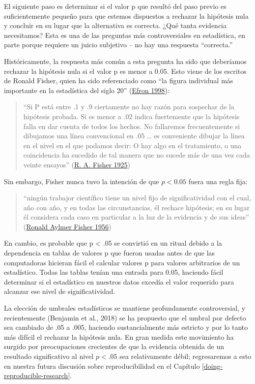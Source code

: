 \documentclass[
  12pt,
]{book}
\begin{document}
El siguiente paso es determinar si el valor p que resultó del paso previo es suficientemente pequeño para que estemos dispuestos a rechazar la hipótesis nula y concluir en su lugar que la alternativa es correcta. ¿Qué tanta evidencia necesitamos? Esta es una de las preguntas más controversiales en estadística, en parte porque requiere un juicio subjetivo -- no hay una respuesta ``correcta.''

Históricamente, la respuesta más común a esta pregunta ha sido que deberíamos rechazar la hipótesis nula si el valor p es menor a 0.05. Esto viene de los escritos de Ronald Fisher, quien ha sido referenciado como ``la figura individual más importante en la estadística del siglo 20'' (\protect\hyperlink{ref-efron1998}{Efron 1998}):

\begin{quote}
``Si P está entre .1 y .9 ciertamente no hay razón para sospechar de la hipótesis probada. Si es menor a .02 indica fuertemente que la hipótesis falla en dar cuenta de todos los hechos. No fallaremos frecuentemente si dibujamos una línea convencional en .05 \ldots{} es conveniente dibujar la línea en el nivel en el que podamos decir: O hay algo en el tratamiento, o una coincidencia ha sucedido de tal manera que no sucede más de una vez cada veinte ensayos'' (\protect\hyperlink{ref-fisher1925statistical}{R. A. Fisher 1925})
\end{quote}

Sin embargo, Fisher nunca tuvo la intención de que \(p < 0.05\) fuera una regla fija:

\begin{quote}
``ningún trabajor científico tiene un nivel fijo de significatividad con el cual, año con año, y en todas las circunstancias, él rechace hipótesis; en su lugar él considera cada caso en particular a la luz de la evidencia y de sus ideas'' (\protect\hyperlink{ref-fish:1956}{Ronald Aylmer Fisher 1956})
\end{quote}

En cambio, es probable que p \textless{} .05 se convirtió en un ritual debido a la dependencia en tablas de valores p que fueron usadas antes de que las computadoras hicieran fácil el calcular valores p para valores arbitrarios de un estadístico. Todas las tablas tenían una entrada para 0.05, haciendo fácil determinar si el estadístico en nuestros datos excedía el valor requerido para alcanzar ese nivel de significatividad.

La elección de umbrales estadísticos se mantiene profundamente controversial, y recientemente (Benjamin et al., 2018) se ha propuesto que el umbral por defecto sea cambiado de .05 a .005, haciendo sustancialmente más estricto y por lo tanto más difícil el rechazar la hipótesis nula. En gran medida este movimiento ha surgido por preocupaciones crecientes de que la evidencia obtenida de un resultado significativo al nivel \(p < .05\) sea relativamente débil; regresaremos a esto en nuestra futura discusión sobre reproducibilidad en el Capítulo \ref{doing-reproducible-research}.
\end{document}
